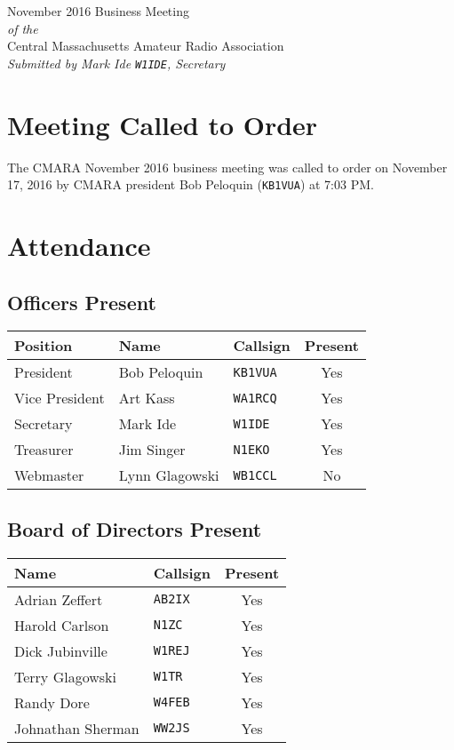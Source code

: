 \documentclass[10pt,letterpaper]{article}
\begin{document}
\begin{center}
{\huge November 2016 Business Meeting}\\
\emph{of the}\\
{\Large Central Massachusetts Amateur Radio Association}\\
\emph{Submitted by Mark Ide \texttt{W1IDE}, Secretary}
\end{center}

\section{Meeting Called to Order}
The CMARA November 2016 business meeting was called to order on November 17, 2016 by CMARA president Bob Peloquin (\texttt{KB1VUA}) at 7:03 PM.

\section{Attendance}

\subsection{Officers Present}
\begin{tabular}{|l|l|l|c|}
  \hline
  \textbf{Position} & \textbf{Name}  & \textbf{Callsign} & \textbf{Present} \\ \hline
  President         & Bob Peloquin   & \texttt{KB1VUA}   & Yes \\
  Vice President    & Art Kass       & \texttt{WA1RCQ}   & Yes \\
  Secretary         & Mark Ide       & \texttt{W1IDE}    & Yes \\
  Treasurer         & Jim Singer     & \texttt{N1EKO}    & Yes \\
  Webmaster         & Lynn Glagowski & \texttt{WB1CCL}   & No \\
  \hline
\end{tabular}

\subsection{Board of Directors Present}
\begin{tabular}{|l|l|c|}
  \hline
  \textbf{Name}     & \textbf{Callsign} & \textbf{Present} \\ \hline
  Adrian Zeffert    & \texttt{AB2IX}    & Yes \\
  Harold Carlson    & \texttt{N1ZC}     & Yes \\
  Dick Jubinville   & \texttt{W1REJ}    & Yes \\
  Terry Glagowski   & \texttt{W1TR}     & Yes \\
  Randy Dore        & \texttt{W4FEB}    & Yes \\
  Johnathan Sherman & \texttt{WW2JS}    & Yes \\
  \hline
\end{tabular}
\end{document}

